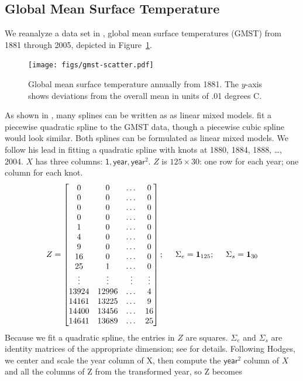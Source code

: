 \documentclass{report}
\newcommand{\textcompute}{\textsf}
\begin{document}
\subsection{Global Mean Surface Temperature}
We reanalyze a data set in \cite{hodges:2013}, global mean surface temperatures (GMST) from 1881 through 2005, depicted in Figure~\ref{fig:gmst-scatter}.  
\begin{figure}
	\centering
	\texttt{[image: figs/gmst-scatter.pdf]}
	\caption{Global mean surface temperature annually from 1881.
		The $y$-axis shows deviations from the overall mean in units of
		.01 degrees C.}
	\label{fig:gmst-scatter}
\end{figure}
As shown in \cite{ruppert_etal:2003}, many splines can be written as as linear mixed models.  \cite{hodges:2013} fit a piecewise quadratic spline to the GMST data, though a piecewise cubic spline would look similar.  Both splines can be formulated as linear mixed models.  We follow his lead in fitting a quadratic spline with knots at 1880, 1884, 1888, \dots, 2004.  $X$ has three columns: $\textcompute{1}, \textcompute{year}, \textcompute{year}^2$.  $Z$ is $125 \times 30$: one row for each year; one column for each knot.
\begin{equation*}
Z =	\begin{bmatrix}
		0 & 0 & \dots & 0\\
		0 & 0 & \dots & 0\\
		0 & 0 & \dots & 0\\
		0 & 0 & \dots & 0\\
		1 & 0 & \dots & 0\\
		4 & 0 & \dots & 0\\
		9 & 0 & \dots & 0\\
		16 & 0 & \dots & 0\\
		25 & 1 & \dots & 0\\
		\vdots & \vdots & \vdots & \vdots\\
		13924 & 12996 & \dots & 4\\
		14161 & 13225 & \dots & 9\\
		14400 & 13456 & \dots & 16\\
		14641 & 13689 & \dots & 25\\
	\end{bmatrix}; \hspace{.5cm} \Sigma_e = \mathbf{1}_{125}; \hspace{.5cm}
		\Sigma_s = \mathbf{1}_{30}
\end{equation*}
Because we fit a quadratic spline, the entries in $Z$ are squares.  $\Sigma_e$ and $\Sigma_s$ are identity matrices of the appropriate dimension; see \cite{hodges:2013} for details.  Following Hodges, we center and scale the \textcompute{year} column of X, then compute the $\textcompute{year}^2$ column of $X$ and all the columns of Z from the transformed \textcompute{year}, so Z becomes
\end{document}
